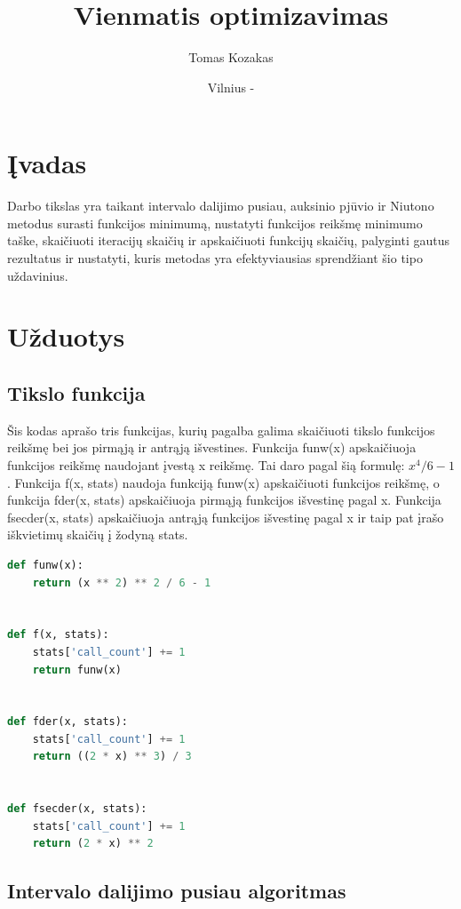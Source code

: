 \documentclass{VUMIFPSkursinis}
\title{Vienmatis optimizavimas}
\author{Tomas Kozakas}
\date{Vilnius - \the\year}
\begin{document}
\maketitle
\tableofcontents

\section{Įvadas}
Darbo tikslas yra taikant intervalo dalijimo pusiau, 
auksinio pjūvio ir Niutono metodus surasti funkcijos minimumą, 
nustatyti funkcijos reikšmę minimumo taške, skaičiuoti iteracijų skaičių 
ir apskaičiuoti funkcijų skaičių, palyginti gautus rezultatus ir nustatyti, 
kuris metodas yra efektyviausias sprendžiant šio tipo uždavinius.

\section{Užduotys}
\subsection{Tikslo funkcija}
Šis kodas aprašo tris funkcijas, kurių pagalba galima skaičiuoti tikslo funkcijos reikšmę bei
jos pirmąją ir antrąją išvestines. Funkcija funw(x) apskaičiuoja funkcijos reikšmę
naudojant įvestą x reikšmę. Tai daro pagal šią formulę: $x^4 / 6 - 1$.
Funkcija f(x, stats) naudoja funkciją funw(x) apskaičiuoti funkcijos reikšmę, 
o funkcija fder(x, stats) apskaičiuoja pirmąją funkcijos išvestinę pagal x.
Funkcija fsecder(x, stats) apskaičiuoja antrąją funkcijos išvestinę pagal x ir 
taip pat įrašo iškvietimų skaičių į žodyną stats. 

\begin{lstlisting}[language=Python]
def funw(x):
    return (x ** 2) ** 2 / 6 - 1


def f(x, stats):
    stats['call_count'] += 1
    return funw(x)


def fder(x, stats):
    stats['call_count'] += 1
    return ((2 * x) ** 3) / 3


def fsecder(x, stats):
    stats['call_count'] += 1
    return (2 * x) ** 2
\end{lstlisting}
\break

\subsection{Intervalo dalijimo pusiau algoritmas}
\end{document}
